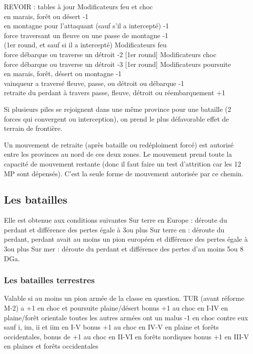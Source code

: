 \label{chMilitary:Battle:Forests} REVOIR : tables à jour
\bparag  Modificateurs feu et choc \\
	en marais, forêt ou désert -1 \\
	en montagne pour l'attaquant (sauf s'il a intercepté) -1 \\
	force traversant un fleuve ou une passe de montagne -1 \\
		(1er round, et sauf si il a intercepté) 
\bparag Modificateurs feu \\
	force débarque ou traverse un détroit -2 [1er round]
\bparag Modificateurs choc \\
	force débarque ou traverse un détroit -3 [1er round]
\bparag Modificateurs poursuite\\
	en marais, forêt, désert ou montagne -1 \\
	vainqueur a traversé fleuve, passe, ou détroit ou débarque -1 \\
	retraite du perdant à travers passe, fleuve, détroit ou réembarquement +1

\aparag Si plusieurs piles se rejoignent dans une même province pour
une bataille (2 forces qui convergent ou interception), on prend le plus
défavorable effet de terrain de frontière.

 Un mouvement de retraite (après bataille ou
redéploiment forcé) est autorisé entre les provinces au
nord de ces deux zones. Le mouvement prend toute la capacité de mouvement
restante (donc il faut faire un test d'attrition car les 12 MP sont dépensés).
C'est la seule forme de mouvement autorisée par ce chemin.

\subsection{Les batailles}
Elle est obtenue aux conditions suivantes
\bparag Sur terre en Europe : déroute du perdant et différence des
pertes égale à 3\LD ou plus 
\bparag Sur terre en \ROTW : déroute du perdant, perdant avait au moins
un pion \ARMY européen et différence des pertes égale à 3\LD ou plus
\bparag Sur mer : déroute du perdant et différence des pertes
d'au moins 5\ND ou 8 DGa.

\subsubsection{Les batailles terrestres}
 Valable si au moins un pion armée
de la classe en question.
  TUR (avant réforme M-2) a +1 en choc et poursuite plaine/désert
\bparag[iim]  bonus +1 au choc en I-IV en plaine/forêt orientale
\bparag[tercios] toutes les autres armées ont un malus -1 en choc contre eux sauf
       i, im, ii et iim en I-V
\bparag[iiim] bonus +1 au choc en IV-V en plaine et forêts occidentales,
\bparag[SUE] bonus de +1 au choc en II-VI en forêts nordiques
\bparag[iv] bonus +1 en III-V en plaines et forêts occidentales

